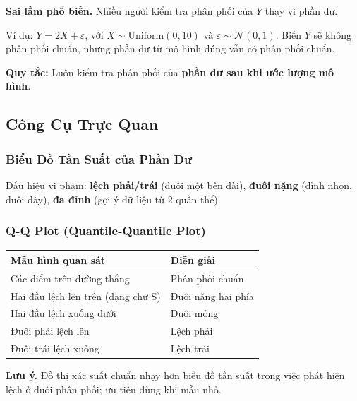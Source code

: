 \documentclass[12pt, a4paper]{article}
\begin{document}
\textbf{Sai lầm phổ biến.} Nhiều người kiểm tra phân phối của $Y$ thay vì phần dư.

Ví dụ: $Y = 2X + \varepsilon$, với $X \sim \mathrm{Uniform}(0,10)$ và $\varepsilon \sim \mathcal{N}(0,1)$. Biến $Y$ sẽ không phân phối chuẩn, nhưng phần dư từ mô hình đúng vẫn có phân phối chuẩn.

\textbf{Quy tắc:} Luôn kiểm tra phân phối của \textbf{phần dư sau khi ước lượng mô hình}.

\subsection{Công Cụ Trực Quan}

\subsubsection{Biểu Đồ Tần Suất của Phần Dư}

Dấu hiệu vi phạm: \textbf{lệch phải/trái} (đuôi một bên dài), \textbf{đuôi nặng} (đỉnh nhọn, đuôi dày), \textbf{đa đỉnh} (gợi ý dữ liệu từ 2 quần thể).

\subsubsection{Q-Q Plot (Quantile-Quantile Plot)}

\vspace{4pt}
\begin{center}
\begin{tabular}{@{}ll@{}}
\toprule
\textbf{Mẫu hình quan sát} & \textbf{Diễn giải} \\
\midrule
Các điểm trên đường thẳng & Phân phối chuẩn \\
Hai đầu lệch lên trên (dạng chữ S) & Đuôi nặng hai phía \\
Hai đầu lệch xuống dưới & Đuôi mỏng \\
Đuôi phải lệch lên & Lệch phải \\
Đuôi trái lệch xuống & Lệch trái \\
\bottomrule
\end{tabular}
\end{center}

\textbf{Lưu ý.} Đồ thị xác suất chuẩn nhạy hơn biểu đồ tần suất trong việc phát hiện lệch ở đuôi phân phối; ưu tiên dùng khi mẫu nhỏ.
\end{document}
